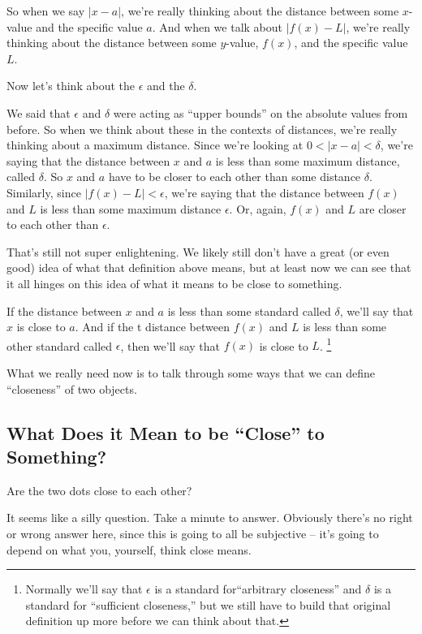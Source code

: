 So when we say $|x-a|$, we're really thinking about the distance between some $x$-value and the specific value $a$. And when we talk about $|f(x)-L|$, we're really thinking about the distance between some $y$-value, $f(x)$, and the specific value $L$.

Now let's think about the $\epsilon$ and the $\delta$.

We said that $\epsilon$ and $\delta$ were acting as ``upper bounds'' on the absolute values from before. So when we think about these in the contexts of distances, we're really thinking about a maximum distance. Since we're looking at $0<|x-a|<\delta$, we're saying that the distance between $x$ and $a$ is less than some maximum distance, called $\delta$. So $x$ and $a$ have to be closer to each other than some distance $\delta$. Similarly, since $|f(x)-L|<\epsilon$, we're saying that the distance between $f(x)$ and $L$ is less than some maximum distance $\epsilon$. Or, again, $f(x)$ and $L$ are closer to each other than $\epsilon$.

That's still not super enlightening. We likely still don't have a great (or even good) idea of what that definition above means, but at least now we can see that it all hinges on this idea of what it means to be close to something.

If the distance between $x$ and $a$ is less than some standard called $\delta$, we'll say that $x$ is close to $a$. And if the t distance between $f(x)$ and $L$ is less than some other standard called $\epsilon$, then we'll say that $f(x)$ is close to $L$.
\footnote{
  Normally we'll say that $\epsilon$ is a standard for``arbitrary closeness'' and $\delta$ is a standard for ``sufficient closeness,'' but we still have to build that original definition up more before we can think about that.
}

What we really need now is to talk through some ways that we can define ``closeness'' of two objects.

\subsection*{What Does it Mean to be ``Close'' to Something?}


Are the two dots close to each other?

It seems like a silly question. Take a minute to answer. Obviously there's no right or wrong answer here, since this is going to all be subjective -- it's going to depend on what you, yourself, think close means.

